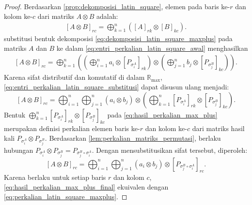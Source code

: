 \begin{proof}
  Berdasarkan \autoref{prop:dekomposisi_latin_square}, elemen pada baris ke-$r$ dan kolom ke-$c$ dari matriks $A \otimes B$ adalah:
  \begin{align}\label{eq:entri_perkalian_latin_square_awal}
    [A \otimes B]_{rc}
    =
    \bigoplus_{k=1}^{n} ([A]_{rk} \otimes [B]_{kc}).
  \end{align}
  substitusi bentuk dekomposisi \eqref{eq:dekomposisi_latin_square_maxplus} pada matriks $A$ dan $B$ ke dalam \eqref{eq:entri_perkalian_latin_square_awal} menghasilkan
  \begin{align}\label{eq:entri_perkalian_latin_square_substitusi}
    [A \otimes B]_{rc}
    =
    \bigoplus_{k=1}^{n}
    \left(
    \left(
    \bigoplus_{i=1}^{n}
    a_i \otimes [P_{\sigma_i^A}]_{rk}
    \right)
    \otimes
    \left(
    \bigoplus_{j=1}^{n}
    b_j \otimes [P_{\sigma_j^B}]_{kc}
    \right)
    \right).
  \end{align}
  Karena sifat distributif dan komutatif di dalam $\mathbb{R}_{\max}$, \eqref{eq:entri_perkalian_latin_square_substitusi} dapat disusun ulang menjadi:
  \begin{equation}\label{eq:hasil_perkalian_max_plus}
    [A \otimes B]_{rc} = \bigoplus_{i=1}^{n} \bigoplus_{j=1}^{n} (a_i \otimes b_j) \otimes \left( \bigoplus_{k=1}^{n} [P_{\sigma_i^A}]_{rk} \otimes [P_{\sigma_j^B}]_{kc} \right).
  \end{equation}
  Bentuk $\bigoplus_{k=1}^{n} [P_{\sigma_i^A}]_{rk} \otimes [P_{\sigma_j^B}]_{kc}$ pada \eqref{eq:hasil_perkalian_max_plus} merupakan definisi perkalian elemen baris ke-$r$ dan kolom ke-$c$ dari matriks hasil kali $P_{\sigma_i^A} \otimes P_{\sigma_j^B}$. Berdasarkan \autoref{lem:perkalian_matriks_permutasi}, berlaku hubungan $P_{\sigma_i^A} \otimes P_{\sigma_j^B} = P_{\sigma_j^B \circ \sigma_i^A}$.
  Dengan mensubstitusikan sifat tersebut, diperoleh:
  \begin{equation}\label{eq:hasil_perkalian_max_plus_final}
    [A \otimes B]_{rc} = \bigoplus_{i=1}^{n} \bigoplus_{j=1}^{n} (a_i \otimes b_j) \otimes [P_{\sigma_j^B \circ \sigma_i^A}]_{rc}.
  \end{equation}
  Karena berlaku untuk setiap baris $r$ dan kolom $c$, \eqref{eq:hasil_perkalian_max_plus_final} ekuivalen dengan \eqref{eq:perkalian_latin_square_maxplus}.
\end{proof}
